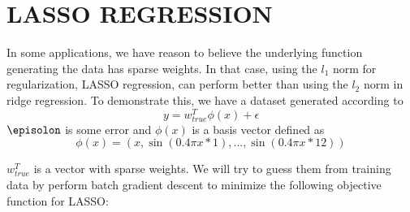 \documentclass[a4paper,twoside]{article}
\begin{document}
\section{\uppercase{LASSO Regression}}
In some applications, we have reason to believe the underlying function generating the data has sparse weights. In that case, using the $l_1$ norm for regularization, LASSO regression, can perform better than using the $l_2$ norm in ridge regression. To demonstrate this, we have a dataset generated according to 
\begin{equation}
y = w_{true}^T \phi (x) + \epsilon
\end{equation}
$\episolon$ is some error and $\phi (x)$ is a basis vector defined as 
\begin{equation}
\phi(x) = (x, \sin(0.4 \pi x * 1), ..., \sin(0.4 \pi x * 12))
\end{equation}

$w_{true}^T$ is a vector with sparse weights. We will try to guess them from training data by perform batch gradient descent to minimize the following objective function for LASSO:
\begin{equation}

\end{equation}



\vfill
\end{document}

